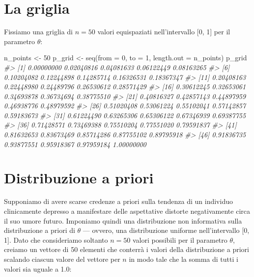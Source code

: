 \documentclass[
]{memoir}
\newenvironment{Shaded}{\begin{snugshade}}{\end{snugshade}}
\newcommand{\AttributeTok}[1]{\textcolor[rgb]{0.77,0.63,0.00}{#1}}
\newcommand{\CommentTok}[1]{\textcolor[rgb]{0.56,0.35,0.01}{\textit{#1}}}
\newcommand{\DecValTok}[1]{\textcolor[rgb]{0.00,0.00,0.81}{#1}}
\newcommand{\FunctionTok}[1]{\textcolor[rgb]{0.00,0.00,0.00}{#1}}
\newcommand{\NormalTok}[1]{#1}
\newcommand{\OtherTok}[1]{\textcolor[rgb]{0.56,0.35,0.01}{#1}}
\begin{document}
\hypertarget{la-griglia}{%
\section{La griglia}\label{la-griglia}}

Fissiamo una griglia di \(n = 50\) valori equispaziati nell'intervallo {[}0, 1{]} per il parametro \(\theta\):

\begin{Shaded}
\begin{Highlighting}[]
\NormalTok{n\_points }\OtherTok{\textless{}{-}} \DecValTok{50}
\NormalTok{p\_grid }\OtherTok{\textless{}{-}} \FunctionTok{seq}\NormalTok{(}\AttributeTok{from =} \DecValTok{0}\NormalTok{, }\AttributeTok{to =} \DecValTok{1}\NormalTok{, }\AttributeTok{length.out =}\NormalTok{ n\_points)}
\NormalTok{p\_grid}
\CommentTok{\#\textgreater{}  [1] 0.00000000 0.02040816 0.04081633 0.06122449 0.08163265}
\CommentTok{\#\textgreater{}  [6] 0.10204082 0.12244898 0.14285714 0.16326531 0.18367347}
\CommentTok{\#\textgreater{} [11] 0.20408163 0.22448980 0.24489796 0.26530612 0.28571429}
\CommentTok{\#\textgreater{} [16] 0.30612245 0.32653061 0.34693878 0.36734694 0.38775510}
\CommentTok{\#\textgreater{} [21] 0.40816327 0.42857143 0.44897959 0.46938776 0.48979592}
\CommentTok{\#\textgreater{} [26] 0.51020408 0.53061224 0.55102041 0.57142857 0.59183673}
\CommentTok{\#\textgreater{} [31] 0.61224490 0.63265306 0.65306122 0.67346939 0.69387755}
\CommentTok{\#\textgreater{} [36] 0.71428571 0.73469388 0.75510204 0.77551020 0.79591837}
\CommentTok{\#\textgreater{} [41] 0.81632653 0.83673469 0.85714286 0.87755102 0.89795918}
\CommentTok{\#\textgreater{} [46] 0.91836735 0.93877551 0.95918367 0.97959184 1.00000000}
\end{Highlighting}
\end{Shaded}

\hypertarget{distribuzione-a-priori}{%
\section{Distribuzione a priori}\label{distribuzione-a-priori}}

Supponiamo di avere scarse credenze a priori sulla tendenza di un individuo clinicamente depresso a manifestare delle aspettative distorte negativamente circa il suo umore futuro. Imponiamo quindi una distribuzione non informativa sulla distribuzione a priori di \(\theta\) --- ovvero, una distribuzione uniforme nell'intervallo {[}0, 1{]}. Dato che consideriamo soltanto \(n = 50\) valori possibili per il parametro \(\theta\), creiamo un vettore di 50 elementi che conterrà i valori della distribuzione a priori scalando ciascun valore del vettore per \(n\) in modo tale che la somma di tutti i valori sia uguale a 1.0:
\end{document}
